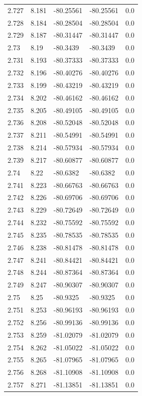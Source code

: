 \begin{tabular}{lllll}
2.727 & 8.181 & -80.25561 & -80.25561 & 0.0 \\
2.728 & 8.184 & -80.28504 & -80.28504 & 0.0 \\
2.729 & 8.187 & -80.31447 & -80.31447 & 0.0 \\
2.73 & 8.19 & -80.3439 & -80.3439 & 0.0 \\
2.731 & 8.193 & -80.37333 & -80.37333 & 0.0 \\
2.732 & 8.196 & -80.40276 & -80.40276 & 0.0 \\
2.733 & 8.199 & -80.43219 & -80.43219 & 0.0 \\
2.734 & 8.202 & -80.46162 & -80.46162 & 0.0 \\
2.735 & 8.205 & -80.49105 & -80.49105 & 0.0 \\
2.736 & 8.208 & -80.52048 & -80.52048 & 0.0 \\
2.737 & 8.211 & -80.54991 & -80.54991 & 0.0 \\
2.738 & 8.214 & -80.57934 & -80.57934 & 0.0 \\
2.739 & 8.217 & -80.60877 & -80.60877 & 0.0 \\
2.74 & 8.22 & -80.6382 & -80.6382 & 0.0 \\
2.741 & 8.223 & -80.66763 & -80.66763 & 0.0 \\
2.742 & 8.226 & -80.69706 & -80.69706 & 0.0 \\
2.743 & 8.229 & -80.72649 & -80.72649 & 0.0 \\
2.744 & 8.232 & -80.75592 & -80.75592 & 0.0 \\
2.745 & 8.235 & -80.78535 & -80.78535 & 0.0 \\
2.746 & 8.238 & -80.81478 & -80.81478 & 0.0 \\
2.747 & 8.241 & -80.84421 & -80.84421 & 0.0 \\
2.748 & 8.244 & -80.87364 & -80.87364 & 0.0 \\
2.749 & 8.247 & -80.90307 & -80.90307 & 0.0 \\
2.75 & 8.25 & -80.9325 & -80.9325 & 0.0 \\
2.751 & 8.253 & -80.96193 & -80.96193 & 0.0 \\
2.752 & 8.256 & -80.99136 & -80.99136 & 0.0 \\
2.753 & 8.259 & -81.02079 & -81.02079 & 0.0 \\
2.754 & 8.262 & -81.05022 & -81.05022 & 0.0 \\
2.755 & 8.265 & -81.07965 & -81.07965 & 0.0 \\
2.756 & 8.268 & -81.10908 & -81.10908 & 0.0 \\
2.757 & 8.271 & -81.13851 & -81.13851 & 0.0 \\

\end{tabular}
